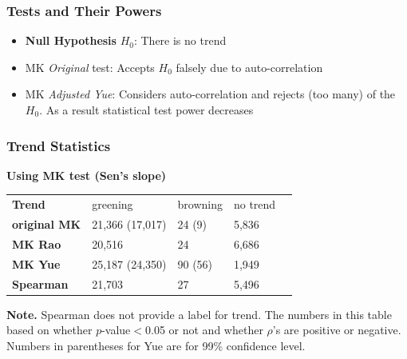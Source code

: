 \documentclass[serif, xcolor={dvipsnames}]{beamer} %
\begin{document}

\begin{frame}
\frametitle{Tests and Their Powers}

\begin{itemize}%
\item {\bf Null Hypothesis}
$H_0$: There is no trend

\item MK {\color{red}\emph{Original}} test: Accepts $H_0$ falsely due to auto-correlation

\item MK {\color{red}\emph{Adjusted Yue}}: Considers auto-correlation and rejects (too many) of the $H_0$. 
As a result statistical test power decreases
\end{itemize}
\end{frame}


\begin{frame}[t]
\frametitle{Trend Statistics}

{\bf Using MK test (Sen's slope)}

\begin{table}[!ht]
\centering
\captionsetup{singlelinecheck=false, format=hang}
\label{tab:Trendcounts}
\begin{tabular}{lllll}
\bottomrule
\rowcolor{shadecolor} \textbf{Trend} & 
 greening & browning & no trend \\ 
\textbf{original MK}  &                                21,366 (17,017) & 24 (9) & 5,836 \\
\rowcolor{shadecolor} \textbf{MK Rao}  & 20,516 & 24 & 6,686 \\
\textbf{MK Yue}  &  25,187 (24,350) & 90 (56) & 1,949 \\
\rowcolor{aliceblue}\textbf{Spearman}  & 21,703 & 27 & 5,496\\
\toprule
\end{tabular}
\end{table}
\begin{tcolorbox}
{\scriptsize{\bf Note.} Spearman does not provide a label for trend. The numbers
in this table based on whether $p$-value$<$0.05 or not and whether $\rho$'s are positive or negative.
Numbers in parentheses for Yue are for 99\% confidence level.
}
\end{tcolorbox}
\end{frame}
\end{document}
